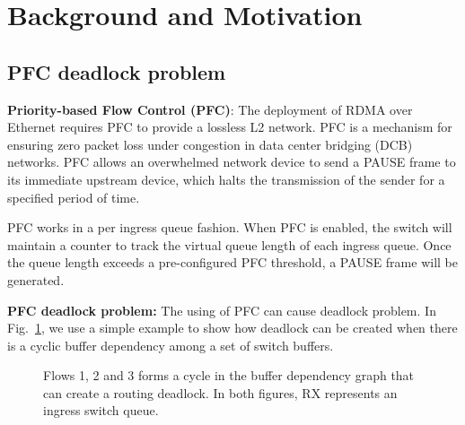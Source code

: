 \section{Background and Motivation}\label{sec:background}

\subsection{PFC deadlock problem}\label{subsec:pfcdeadlock}



\textbf{Priority-based Flow Control (PFC)}: The deployment of RDMA over Ethernet requires PFC  to provide a lossless L2 network. PFC is a mechanism for ensuring zero packet loss under congestion in data center bridging (DCB) networks. PFC allows an overwhelmed network device to send a PAUSE frame to its immediate upstream device, which halts the transmission of the sender for a specified period of time.  

PFC works in a per ingress queue fashion. When PFC is enabled, the switch will maintain a counter to track the virtual queue length of each ingress queue. Once the queue length exceeds a pre-configured PFC threshold, a PAUSE frame will be generated.



\textbf{PFC deadlock problem:} The using of PFC can cause deadlock problem. In Fig.~\ref{fig:deadlock_case}, we use a simple example to show how  deadlock can be created when there is a cyclic buffer dependency among a set of switch buffers.

\begin{figure}[t]
	\centering
	
	
	\caption{Flows 1, 2 and 3 forms a cycle in the buffer dependency graph that can create a routing deadlock. In both figures, RX represents an ingress switch queue.}\label{fig:deadlock_case}
	
\end{figure}

